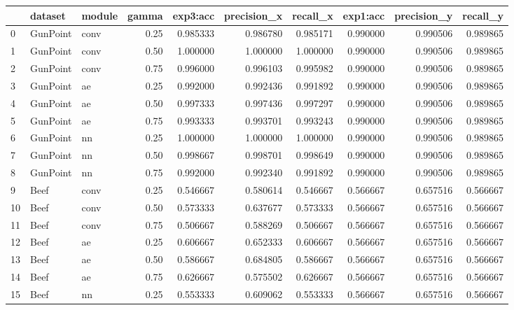 \begin{tabular}{lllrrrrrrr}
\toprule
{} &   dataset & module &  gamma &  exp3:acc &  precision\_x &  recall\_x &  exp1:acc &  precision\_y &  recall\_y \\
\midrule
0  &  GunPoint &   conv &   0.25 &  0.985333 &     0.986780 &  0.985171 &  0.990000 &     0.990506 &  0.989865 \\
1  &  GunPoint &   conv &   0.50 &  1.000000 &     1.000000 &  1.000000 &  0.990000 &     0.990506 &  0.989865 \\
2  &  GunPoint &   conv &   0.75 &  0.996000 &     0.996103 &  0.995982 &  0.990000 &     0.990506 &  0.989865 \\
3  &  GunPoint &     ae &   0.25 &  0.992000 &     0.992436 &  0.991892 &  0.990000 &     0.990506 &  0.989865 \\
4  &  GunPoint &     ae &   0.50 &  0.997333 &     0.997436 &  0.997297 &  0.990000 &     0.990506 &  0.989865 \\
5  &  GunPoint &     ae &   0.75 &  0.993333 &     0.993701 &  0.993243 &  0.990000 &     0.990506 &  0.989865 \\
6  &  GunPoint &     nn &   0.25 &  1.000000 &     1.000000 &  1.000000 &  0.990000 &     0.990506 &  0.989865 \\
7  &  GunPoint &     nn &   0.50 &  0.998667 &     0.998701 &  0.998649 &  0.990000 &     0.990506 &  0.989865 \\
8  &  GunPoint &     nn &   0.75 &  0.992000 &     0.992340 &  0.991892 &  0.990000 &     0.990506 &  0.989865 \\
9  &      Beef &   conv &   0.25 &  0.546667 &     0.580614 &  0.546667 &  0.566667 &     0.657516 &  0.566667 \\
10 &      Beef &   conv &   0.50 &  0.573333 &     0.637677 &  0.573333 &  0.566667 &     0.657516 &  0.566667 \\
11 &      Beef &   conv &   0.75 &  0.506667 &     0.588269 &  0.506667 &  0.566667 &     0.657516 &  0.566667 \\
12 &      Beef &     ae &   0.25 &  0.606667 &     0.652333 &  0.606667 &  0.566667 &     0.657516 &  0.566667 \\
13 &      Beef &     ae &   0.50 &  0.586667 &     0.684805 &  0.586667 &  0.566667 &     0.657516 &  0.566667 \\
14 &      Beef &     ae &   0.75 &  0.626667 &     0.575502 &  0.626667 &  0.566667 &     0.657516 &  0.566667 \\
15 &      Beef &     nn &   0.25 &  0.553333 &     0.609062 &  0.553333 &  0.566667 &     0.657516 &  0.566667 \\

\end{tabular}
